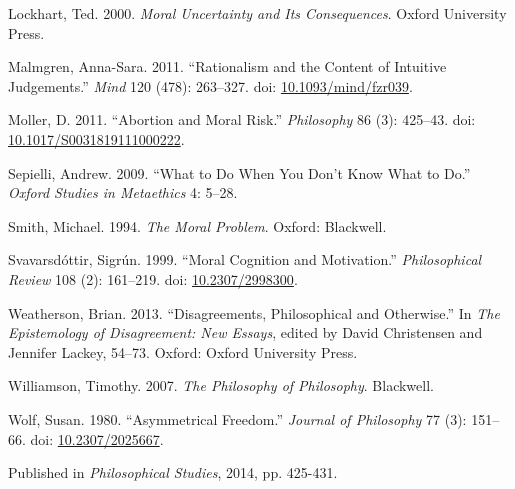 \documentclass[
  11pt,
  letterpaper,
  DIV=11,
  numbers=noendperiod,
  twoside]{scrartcl}
\newlength{\cslhangindent}
\newenvironment{CSLReferences}[2] %
 {\begin{list}{}{%
  \setlength{\itemindent}{0pt}
  \setlength{\leftmargin}{0pt}
  \setlength{\parsep}{0pt}
  \ifodd #1
   \setlength{\leftmargin}{\cslhangindent}
   \setlength{\itemindent}{-1\cslhangindent}
  \fi
  \setlength{\itemsep}{#2\baselineskip}}}
 {\end{list}}
\begin{document}
\begin{CSLReferences}{1}{0}
Lockhart, Ted. 2000. \emph{Moral Uncertainty and Its Consequences}.
Oxford University Press.

Malmgren, Anna-Sara. 2011. {``Rationalism and the Content of Intuitive
Judgements.''} \emph{Mind} 120 (478): 263--327. doi:
\href{https://doi.org/10.1093/mind/fzr039}{10.1093/mind/fzr039}.

Moller, D. 2011. {``Abortion and Moral Risk.''} \emph{Philosophy} 86
(3): 425--43. doi:
\href{https://doi.org/10.1017/S0031819111000222}{10.1017/S0031819111000222}.

Sepielli, Andrew. 2009. {``What to Do When You Don't Know What to Do.''}
\emph{Oxford Studies in Metaethics} 4: 5--28.

Smith, Michael. 1994. \emph{The Moral Problem}. Oxford: Blackwell.

Svavarsdóttir, Sigrún. 1999. {``Moral Cognition and Motivation.''}
\emph{Philosophical Review} 108 (2): 161--219. doi:
\href{https://doi.org/10.2307/2998300}{10.2307/2998300}.

Weatherson, Brian. 2013. {``Disagreements, Philosophical and
Otherwise.''} In \emph{The Epistemology of Disagreement: New Essays},
edited by David Christensen and Jennifer Lackey, 54--73. Oxford: Oxford
University Press.

Williamson, Timothy. 2007. \emph{{The Philosophy of Philosophy}}.
Blackwell.

Wolf, Susan. 1980. {``Asymmetrical Freedom.''} \emph{Journal of
Philosophy} 77 (3): 151--66. doi:
\href{https://doi.org/10.2307/2025667}{10.2307/2025667}.

\end{CSLReferences}



\noindent Published in\emph{
Philosophical Studies}, 2014, pp. 425-431.
\end{document}

